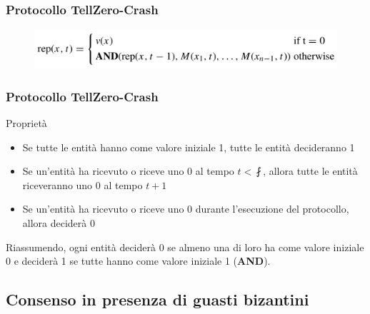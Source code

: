 		\begin{frame}
			\frametitle{Protocollo TellZero-Crash}	
			\begin{center}
				\begin{figure}
				\end{figure}
				\begin{figure}
					\includegraphics[width=\textwidth]{img/rep}
				\end{figure}
			\end{center}
		\end{frame}
		
		\begin{frame}
			\frametitle{Protocollo TellZero-Crash}	
			\begin{block}{Proprietà}
				\begin{itemize}
					\item Se tutte le entità hanno come valore iniziale 1, tutte le entità \nguasta decideranno 1
					\item Se un'entità \nguasta ha ricevuto o riceve uno 0 al tempo $t < \fint$, allora tutte le entità \nguasta riceveranno uno 0 al tempo $t+1$
					\item Se un'entità \nguasta ha ricevuto o riceve uno 0 durante l'esecuzione del protocollo, allora deciderà 0
				\end{itemize}
			\end{block}
			Riassumendo, ogni entità \nguasta deciderà 0 se almeno una di loro ha come valore iniziale 0 e deciderà 1 se tutte hanno come valore iniziale 1 (\textbf{AND}).
		\end{frame}
	
	\subsection{Consenso in presenza di guasti bizantini}
	
